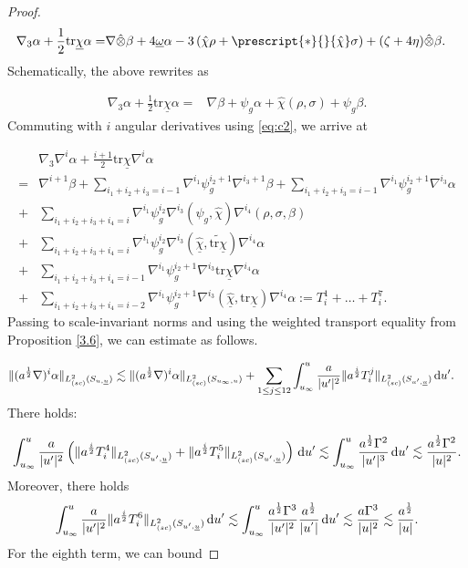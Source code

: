 \documentclass{amsart}
\newcommand{\aln}{(\al \nabla)^i}
\newcommand{\ali}{a^{\frac{i}{2}}}
\newcommand{\omegabar}{\underline{\omega}}
\newcommand{\intu}{\int_{u_{\infty}}^u}
\newcommand{\chihat}{\hat{\chi}}
\newcommand{\upr}{\lvert u^\prime \rvert}
\newcommand{\al}{a^{\frac{1}{2}}}
\newcommand{\chibar}{\underline{\chi}}
\newcommand{\chibarhat}{\underline{\hat{\chi}}}
\newcommand{\ubar}{\underline{u}}
\newcommand{\sumitm}{\sum_{i_1+i_2+i_3=i-1}}
\newcommand{\sumif}{\sum_{i_1+i_2+i_3+i_4=i}}
\newcommand{\sumifi}{\sum_{i_1+i_2+i_3+i_4=i-1}}
\newcommand{\sumifim}{\sum_{i_1+i_2+i_3+i_4=i-2}}
\newcommand{\tildetr}{\widetilde{\tr \chibar}}
\newcommand{\nablap}{\nabla^{i_1}\psi_g^{i_2}}
\newcommand{\nablapp}{\nabla^{i_1}\psi_g^{i_2+1}}
\newcommand{\scaletwoSu}[1]{\lVert{#1} \rVert_{L^2_{(sc)}(S_{u,\ubar})}}
\newcommand{\scaletwoSuprime}[1]{\lVert{#1} \rVert_{L^2_{(sc)}(S_{u^\prime,\ubar})}}
\newcommand{\duprime}{\hspace{.5mm} \text{d}u^{\prime}}
\newcommand{\nablat}{\nabla^{i_3}}
\newcommand{\nablaf}{\nabla^{i_4}}
\newcommand{\Hodge}[1]{\prescript{*}{}{#1}}
\newcommand{\tr}{\mbox{tr}}
\begin{document}
{\begin{proof}
    \begin{align}
	      \nonumber   \nabla_3 \alpha + \frac{1}{2}\tr\chibar \alpha = &\nabla \hat{\otimes}\beta + 4 \omegabar \alpha - 3\left(\chihat \rho + \Hodge{\chihat} \sigma \right)+ (\zeta+4\eta)\hat{\otimes}\beta.
    \end{align}Schematically, the above rewrites as 
    
    \begin{align}
	\nonumber         \nabla_3 \alpha + \frac{1}{2}\tr\chibar \alpha = &\nabla \beta+ \psi_g \alpha + \chihat(\rho,\sigma) + \psi_g \beta.
    \end{align}Commuting with $i$ angular derivatives using \ref{eq:c2}, we arrive at
    
    \begin{align}
      \nonumber  & \nabla_3 \nabla^i \alpha + \frac{i+1}{2}\tr\chibar \nabla^i\alpha\\  = &\nabla^{i+1}\beta  \nonumber + \sumitm \nablapp \nabla^{i_3+1}\beta +\sumitm \nablapp \nablat \alpha\\ \nonumber  +& \sumif \nablap \nablat (\psi_g,\chihat) \nablaf (\rho,\sigma, \beta) \\ \nonumber + &\sumif \nablap \nablat (\chibarhat,\tildetr) \nablaf \alpha \\ \nonumber +& \sumifi \nablapp \nablat \tr\chibar \nablaf \alpha \\+&\sumifim \nablapp \nablat(\chibarhat,\tr\chibar)\nablaf \alpha:=T_i^1 +\dots + T_i^{7}.
    \end{align}Passing to scale-invariant norms and using the weighted transport equality from Proposition \ref{3.6}, we can estimate as follows.
    
    \begin{align}
    \scaletwoSu{\aln \alpha} &\lesssim \lVert \aln \alpha \rVert_{L^2_{(sc)}(S_{u_{\infty}, u})} + \sum_{1\leq j \leq 12} \intu \frac{a}{\upr^2}\scaletwoSuprime{\ali T_i^{j}}\duprime.
    \end{align} There holds:
    
    \begin{align}
        \intu \frac{a}{\upr^2}\left(\scaletwoSuprime{\ali T_i^4}+ \scaletwoSuprime{\ali T_i^5}\right) \duprime \lesssim \intu \frac{\al\Gamma^2}{\upr^3}\duprime \lesssim \frac{a^{\frac{1}{2}}\Gamma^{2}}{|u|^{2}}.
    \end{align}Moreover, there holds
     \begin{align}
        \intu \frac{a}{\upr^2}\scaletwoSuprime{\ali T_i^6} \duprime \lesssim \intu \frac{\al\Gamma^3}{\upr^2}\frac{a^{\frac{1}{2}}}{|u^{'}|}\duprime \lesssim \frac{a\Gamma^{3}}{|u|^{2}}\lesssim \frac{a^{\frac{1}{2}}}{|u|}.
    \end{align}\noindent For the eighth term, we can bound
    

\end{proof}}
\end{document}
